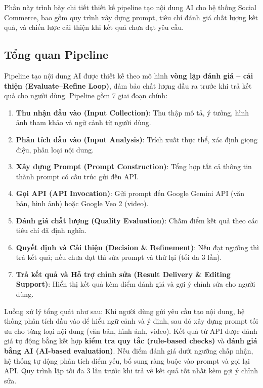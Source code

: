 Phần này trình bày chi tiết thiết kế pipeline tạo nội dung AI cho hệ thống Social Commerce, bao gồm quy trình xây dựng prompt, tiêu chí đánh giá chất lượng kết quả, và chiến lược cải thiện khi kết quả chưa đạt yêu cầu.

\subsection{Tổng quan Pipeline}

Pipeline tạo nội dung AI được thiết kế theo mô hình \textbf{vòng lặp đánh giá -- cải thiện (Evaluate--Refine Loop)}, đảm bảo chất lượng đầu ra trước khi trả kết quả cho người dùng. Pipeline gồm 7 giai đoạn chính:

\begin{enumerate}
    \item \textbf{Thu nhận đầu vào (Input Collection)}: Thu thập mô tả, ý tưởng, hình ảnh tham khảo và ngữ cảnh từ người dùng.
    \item \textbf{Phân tích đầu vào (Input Analysis)}: Trích xuất thực thể, xác định giọng điệu, phân loại nội dung.
    \item \textbf{Xây dựng Prompt (Prompt Construction)}: Tổng hợp tất cả thông tin thành prompt có cấu trúc gửi đến API.
    \item \textbf{Gọi API (API Invocation)}: Gửi prompt đến Google Gemini API (văn bản, hình ảnh) hoặc Google Veo 2 (video).
    \item \textbf{Đánh giá chất lượng (Quality Evaluation)}: Chấm điểm kết quả theo các tiêu chí đã định nghĩa.
    \item \textbf{Quyết định và Cải thiện (Decision \& Refinement)}: Nếu đạt ngưỡng thì trả kết quả; nếu chưa đạt thì sửa prompt và thử lại (tối đa 3 lần).
    \item \textbf{Trả kết quả và Hỗ trợ chỉnh sửa (Result Delivery \& Editing Support)}: Hiển thị kết quả kèm điểm đánh giá và gợi ý chỉnh sửa cho người dùng.
\end{enumerate}


Luồng xử lý tổng quát như sau: Khi người dùng gửi yêu cầu tạo nội dung, hệ thống phân tích đầu vào để hiểu ngữ cảnh và ý định, sau đó xây dựng prompt tối ưu cho từng loại nội dung (văn bản, hình ảnh, video). Kết quả từ API được đánh giá tự động bằng kết hợp \textbf{kiểm tra quy tắc (rule-based checks)} và \textbf{đánh giá bằng AI (AI-based evaluation)}. Nếu điểm đánh giá dưới ngưỡng chấp nhận, hệ thống tự động phân tích điểm yếu, bổ sung ràng buộc vào prompt và gọi lại API. Quy trình lặp tối đa 3 lần trước khi trả về kết quả tốt nhất kèm gợi ý chỉnh sửa.

